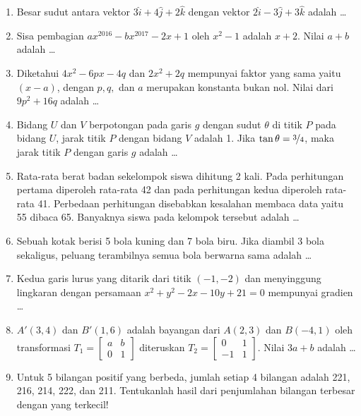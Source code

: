 \begin{enumerate}
\item Besar sudut antara vektor $3\hat{i} + 4\hat{j} + 2\hat{k}$ dengan vektor $2\hat{i} - 3\hat{j} + 3\hat{k}$ adalah \ldots

\item Sisa pembagian $ax^{2016} - bx^{2017} - 2x+1$ oleh $x^2-1$ adalah $x+2$. Nilai $a+b$ adalah \ldots

\item Diketahui $4x^2-6px-4q$ dan $2x^2+2q$ mempunyai faktor yang sama yaitu $(x-a)$, dengan $p,q,$ dan $a$ merupakan konstanta bukan nol. Nilai dari $9p^2 + 16q$ adalah \ldots

\item Bidang $U$ dan $V$ berpotongan pada garis $g$ dengan sudut $\theta$ di titik $P$ pada bidang $U$, jarak titik $P$ dengan bidang $V$ adalah 1. Jika $\tan \theta = \nicefrac{3}{4}$, maka jarak titik $P$ dengan garis $g$ adalah \ldots

\item Rata-rata berat badan sekelompok siswa dihitung 2 kali. Pada perhitungan pertama diperoleh rata-rata 42 dan pada perhitungan kedua diperoleh rata-rata 41. Perbedaan perhitungan disebabkan kesalahan membaca data yaitu 55 dibaca 65. Banyaknya siswa pada kelompok tersebut adalah \ldots

\item Sebuah kotak berisi 5 bola kuning dan 7 bola biru. Jika diambil 3 bola sekaligus, peluang terambilnya semua bola berwarna sama adalah \ldots

\item Kedua garis lurus yang ditarik dari titik $(-1,-2)$ dan menyinggung lingkaran dengan persamaan $x^2+y^2-2x-10y+21=0$ mempunyai gradien \ldots

\item $A'(3,4)$ dan $B'(1,6)$ adalah bayangan dari $A(2,3)$ dan $B(-4,1)$ oleh transformasi $T_1 = \begin{bmatrix} a & b\\ 0 & 1\end{bmatrix}$ diteruskan $T_2 = \begin{bmatrix} 0 & 1 \\ -1 & 1\end{bmatrix}$. Nilai $3a + b$ adalah \ldots

\item Untuk 5 bilangan positif yang berbeda, jumlah setiap 4 bilangan adalah 221, 216, 214, 222, dan 211. Tentukanlah hasil dari penjumlahan bilangan terbesar dengan yang terkecil!


\end{enumerate}
